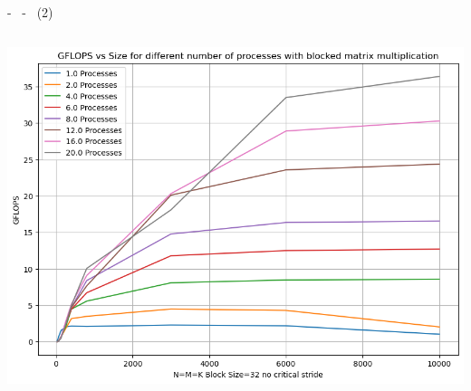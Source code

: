 \documentclass[compress]{beamer}
\begin{document}
\begin{frame}{\secname \text{ }- \subsecname\ \text{ }- \subsubsecname\ (2)}
\begin{columns}
\begin{minipage}{1\textwidth}
\begin{adjustbox}{margin=0cm 0cm 0cm 0.5cm, center}
                    \includegraphics[width=1\textwidth, frame]{resources/square_blocked_nocrit.png}
                \end{adjustbox}
            \end{minipage}
    \end{columns}
\end{frame}
\end{document}
